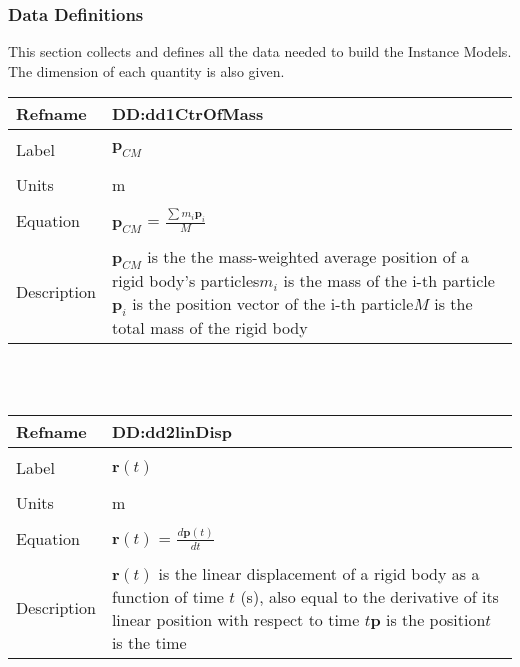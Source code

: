 \documentclass[12pt]{article}
\begin{document}
\subsubsection{Data Definitions}
\label{Sec:DD}
This section collects and defines all the data needed to build the Instance Models. The dimension of each quantity is also given.
~\newline
\noindent \begin{minipage}{\textwidth}
\begin{tabular}{p{} p{}}
\toprule \textbf{Refname} & \textbf{DD:dd1CtrOfMass}
\label{DD:dd1CtrOfMass}
\\ \midrule \\
Label & $\mathbf{p}_{CM}$
\\ \midrule \\
Units & m
\\ \midrule \\
Equation & $\mathbf{p}_{CM}$ = $\frac{\sum{m_{i}\mathbf{p}_{i}}}{M}$
\\ \midrule \\
Description & $\mathbf{p}_{CM}$ is the the mass-weighted average position of a rigid body's particles\newline$m_{i}$ is the mass of the i-th particle\newline$\mathbf{p}_{i}$ is the position vector of the i-th particle\newline$M$ is the total mass of the rigid body
\\ \bottomrule \end{tabular}
\end{minipage}\\
~\newline
\noindent \begin{minipage}{\textwidth}
\begin{tabular}{p{} p{}}
\toprule \textbf{Refname} & \textbf{DD:dd2linDisp}
\label{DD:dd2linDisp}
\\ \midrule \\
Label & $\mathbf{r}(t)$
\\ \midrule \\
Units & m
\\ \midrule \\
Equation & $\mathbf{r}(t)$ = $\frac{d\mathbf{p}(t)}{dt}$
\\ \midrule \\
Description & $\mathbf{r}(t)$ is the linear displacement of a rigid body as a function of time $t$ (s), also equal to the derivative of its linear position with respect to time $t$\newline$\mathbf{p}$ is the position\newline$t$ is the time
\\ \bottomrule \end{tabular}
\end{minipage}\\
\end{document}
